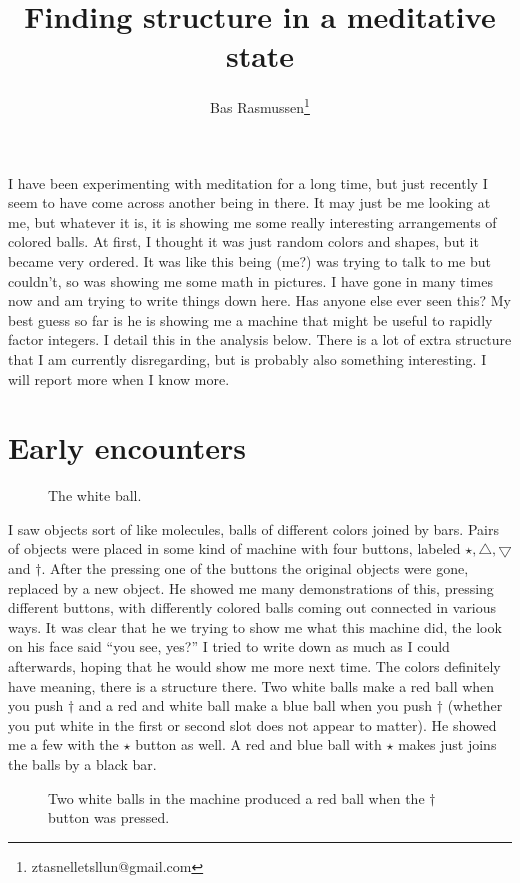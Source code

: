 \documentclass[12pt]{article}
\title{Finding structure in a meditative state}
\author{Bas Rasmussen\thanks{ztasnelletsllun@gmail.com}}
\newcommand{\gcd}{\operatorname{gcd}}
\def\gcd{\bigtriangledown}
\def\lcm{\bigtriangleup}
\begin{document}
\maketitle
I have been experimenting with meditation for a long time, but just recently I seem to have come across another being in there.  It may just be me looking at me, but whatever it is, it is
showing me some really interesting arrangements of colored balls.  At first, I thought it was just random colors and shapes, but it became very ordered.  It was like this being (me?)
was trying to talk to me but couldn't, so was showing me some math in pictures.   I have gone in many times now and am trying to write things down here.  Has anyone else
ever seen this?  My best guess so far is he is showing me a machine that might be useful to rapidly factor integers.  I detail this in the analysis below.  There is a lot of extra structure
that I am currently disregarding, but is probably also something interesting.  I will report more when I know more.

\section{Early encounters}
\begin{figure}
\centering
{}
\caption{The white ball.}
\end{figure}

I saw objects sort of like molecules, balls of different colors joined by bars.   Pairs of objects were placed in
some kind of machine with four buttons, labeled $\star, \lcm, \gcd$ and $\dagger$.  After the pressing one of the buttons the original
objects were gone, replaced by a new object.  He showed me many demonstrations of this, pressing different buttons, with differently colored balls coming out
connected in various ways.  It was clear that he we trying to show me what this machine did, the look on his face said ``you see, yes?''  I tried to write down as much
as I could afterwards, hoping that he would show me more next time.  The colors definitely have meaning, there is a structure there.  Two white balls
make a red ball when you push $\dagger$ and a red and white ball make a blue ball when you push $\dagger$ (whether you put white in the first or second slot
does not appear to matter).  He showed me a few with the $\star$ button as well.  A red and blue ball with $\star$ makes just joins the balls by a black bar.  
\begin{figure}
\centering
{}
\caption{Two white balls in the machine produced a red ball when the $\dagger$ button was pressed.}
\end{figure}
\end{document}
